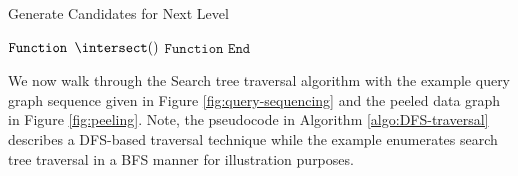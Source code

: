 \begin{algorithm}
    \caption{Generate Candidates for Next Level}
    \label{algo:intersect}
    $\texttt{Function }\intersect() $\newline
    $\texttt{Function End}$
\end{algorithm}

We now walk through the Search tree traversal algorithm with the example query graph sequence given in Figure \ref{fig:query-sequencing} and the peeled data graph in Figure \ref{fig:peeling}.
Note, the pseudocode in Algorithm \ref{algo:DFS-traversal} describes a DFS-based traversal technique while the example enumerates search tree traversal in a BFS manner for illustration purposes.

